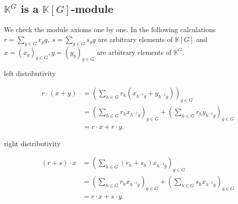 \documentclass[titlepage, a4paper]{article}
\theoremstyle{remark}
\begin{document}
\subsection{$\mathbb K^G$ is a $\mathbb K[G]$-module}
	We check the module axioms one by one.
        In the following calculations $r = \sum_{g \in G}^{} r_g g,\ s = \sum_{g \in G}^{} s_g g$ are arbitrary elements of $\mathbb{K}[G]$ and $x = (x_g)_{g \in G}, y = (y_g)_{g \in G}$ are arbitrary elements of $\mathbb{K}^{G}$.
        \begin{description}
            \item[left distributivity] 
                \begin{align*}
                    r\cdot (x+y) &= \left( \sum_{h \in G} r_h (x_{h^{-1} g} + y_{h^{-1} g}) \right)_{g \in G} \\
                             &= \left( \sum_{h \in G} r_h x_{h^{-1} g} \right)_{g \in G}  + \left( \sum_{h \in G} r_h y_{h^{-1}g} \right)_{g \in G}  \\
                             &= r\cdot x + r\cdot y 
                .\end{align*}
            \item[right distributivity]
                \begin{align*}
                    (r + s)\cdot x &= \left( \sum_{h \in G} (r_h + s_h) x_{h^{-1} g} \right)_{g \in G}  \\
                               &= \left( \sum_{h \in G} r_h x_{h^{-1}g} \right)_{g \in G} + \left( \sum_{h \in G} s_{h} x_{h^{-1}g}  \right)_{g \in G} \\ 
                               &= r\cdot x + s \cdot y 
                .\end{align*}
        

\end{description}
\end{document}
